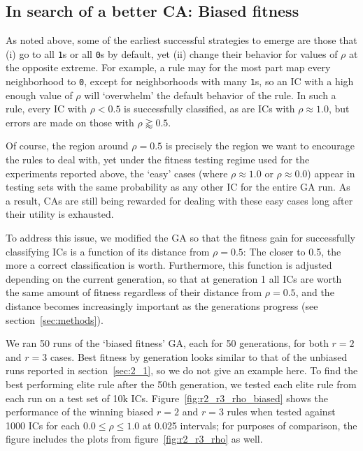 \subsection{In search of a better CA: Biased fitness} \label{sec:2_3}

As noted above, some of the earliest successful strategies to emerge are those that (i) go to all \texttt{1}s or all \texttt{0}s by default, 
yet (ii) change their behavior for values of $\rho$ at the opposite extreme. For example, a rule may for the most part map every 
neighborhood to \texttt{0}, except for neighborhoods with many \texttt{1}s, so an IC with a high enough value of $\rho$ will 
`overwhelm' the default behavior of the rule. In such a rule, every IC with $\rho < 0.5$ is successfully classified, as are ICs with $\rho \approx 1.0$, but 
errors are made on those with $\rho \gtrapprox 0.5$.

Of course, the region around $\rho = 0.5$ is precisely the region we want to encourage the rules to deal with, yet under the fitness testing regime 
used for the experiments reported above, the `easy' cases (where $\rho \approx 1.0$ or $\rho \approx 0.0$) appear in testing sets  
with the same probability as any other IC for the entire GA run. As a result, CAs are still being rewarded for dealing with these easy cases long after their 
utility is exhausted.

To address this issue, we modified the GA so that the fitness gain for successfully classifying ICs is a function of its distance from $\rho = 0.5$: The 
closer to 0.5, the more a correct classification is worth. Furthermore, this function is adjusted depending on the current generation, so that at generation 1 
all ICs are worth the same amount of fitness regardless of their distance from $\rho = 0.5$, and the distance becomes increasingly important as 
the generations progress (see section~\ref{sec:methods}).

We ran 50 runs of the `biased fitness' GA, each for 50 generations, for both $r = 2$ and $r = 3$ cases. Best fitness by generation looks similar to that 
of the unbiased runs reported in section~\ref{sec:2_1}, so we do not give an example here. To find the best performing elite rule after the 
50th generation, we tested each elite rule from each run on a test set of 10k ICs. Figure~\ref{fig:r2_r3_rho_biased} shows the performance 
of the winning biased $r = 2$ and $r = 3$ rules when tested against 1000 ICs for each $0.0 \leq \rho \leq 1.0$ at 0.025 intervals; for purposes of 
comparison, the figure includes the plots from figure~\ref{fig:r2_r3_rho} as well.

